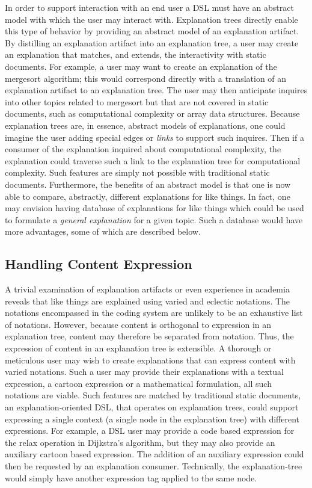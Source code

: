 \documentclass[sigconf]{acmart}
\begin{document}
In order to support interaction with an end user a DSL must have an abstract
model with which the user may interact with. Explanation trees directly enable
this type of behavior by providing an abstract model of an explanation artifact.
%
By distilling an explanation artifact into an explanation tree, a user may
create an explanation that matches, and extends, the interactivity with static
documents. For example, a user may want to create an explanation of the
mergesort algorithm; this would correspond directly with a translation of an
explanation artifact to an explanation tree. The user may then anticipate
inquires into other topics related to mergesort but that are not covered in
static documents, such as computational complexity or array data structures.
%
Because explanation trees are, in essence, abstract models of explanations, one
could imagine the user adding special edges or \emph{links} to support such
inquires. Then if a consumer of the explanation inquired about computational
complexity, the explanation could traverse such a link to the explanation tree
for computational complexity. Such features are simply not possible with
traditional static documents.
%
Furthermore, the benefits of an abstract model is that one is now able to
compare, abstractly, different explanations for like things. In fact, one may
envision having database of explanations for like things which could be used to
formulate a \emph{general explanation} for a given topic. Such a database would
have more advantages, some of which are described below.

\subsection{Handling Content Expression}
\label{sec:dis:expr}
A trivial examination of explanation artifacts or even experience in academia
reveals that like things are explained using varied and eclectic notations. The
notations encompassed in the coding system are unlikely to be an exhaustive list
of notations. However, because content is orthogonal to expression in an
explanation tree, content may therefore be separated from notation. Thus, the
expression of content in an explanation tree is extensible. A thorough or
meticulous user may wish to create explanations that can express content with
varied notations. Such a user may provide their explanations with a textual
expression, a cartoon expression or a mathematical formulation, all such
notations are viable. Such features are matched by traditional static documents,
an explanation-oriented DSL, that operates on explanation trees, could support
expressing a single context (a single node in the explanation tree) with
different expressions. For example, a DSL user may provide a code based
expression for the relax operation in Dijkstra's algorithm, but they may also
provide an auxiliary cartoon based expression. The addition of an auxiliary
expression could then be requested by an explanation consumer. Technically, the
explanation-tree would simply have another expression tag applied to the same
node. 
\end{document}
